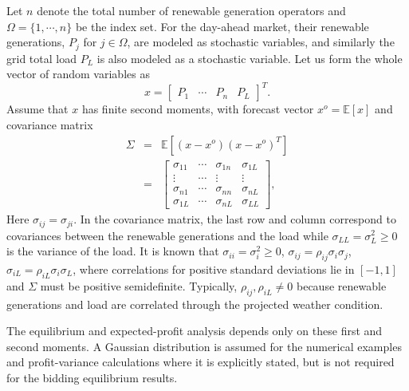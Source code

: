 \documentclass[journal]{IEEEtran}
\begin{document}
Let $n$ denote the total number of renewable generation operators and $\Omega=\{1,\cdots,n\}$ be the index set. For the day-ahead market, their renewable generations, $P_j$ for $j\in\Omega$, are modeled as stochastic variables, and similarly the grid total load $P_L$ is also modeled as a stochastic variable. Let us form the whole vector of random variables as 
\begin{equation} 
x = \begin{bmatrix} P_1 & \cdots & P_n & P_L \end{bmatrix}^T.  \label{eq:x}
\end{equation}
Assume that $x$ has finite second moments, with forecast vector $x^o=\mathbb E[x]$ and covariance matrix
\begin{eqnarray*}
\Sigma & = & \mathbb{E}[(x-x^o)(x-x^o)^T] \\
& = & \begin{bmatrix} \sigma_{11} & \cdots & \sigma_{1n} & \sigma_{1L} \\ \vdots & \cdots & \vdots & \vdots \\ \sigma_{n1} & \cdots & \sigma_{nn} & \sigma_{nL} \\ \sigma_{1L} & \cdots & \sigma_{nL} & \sigma_{LL}
\end{bmatrix},  
\end{eqnarray*}
Here $\sigma_{ij}=\sigma_{ji}$. In the covariance matrix, the last row and column correspond to covariances between the renewable generations and the load while $\sigma_{LL}=\sigma_L^2\geq0$ is the variance of the load. It is known that
$\sigma_{ii}=\sigma_i^2\geq0$, $\sigma_{ij}=\rho_{ij}\sigma_i\sigma_j$, $\sigma_{iL}=\rho_{iL}\sigma_i\sigma_L$, where correlations for positive standard deviations lie in $[-1,1]$ and $\Sigma$ must be positive semidefinite. Typically, $\rho_{ij},\rho_{iL}\not=0$ because renewable generations and load are correlated through the projected weather condition.

The equilibrium and expected-profit analysis depends only on these first and second moments. A Gaussian distribution is assumed for the numerical examples and profit-variance calculations where it is explicitly stated, but is not required for the bidding equilibrium results.
\end{document}
